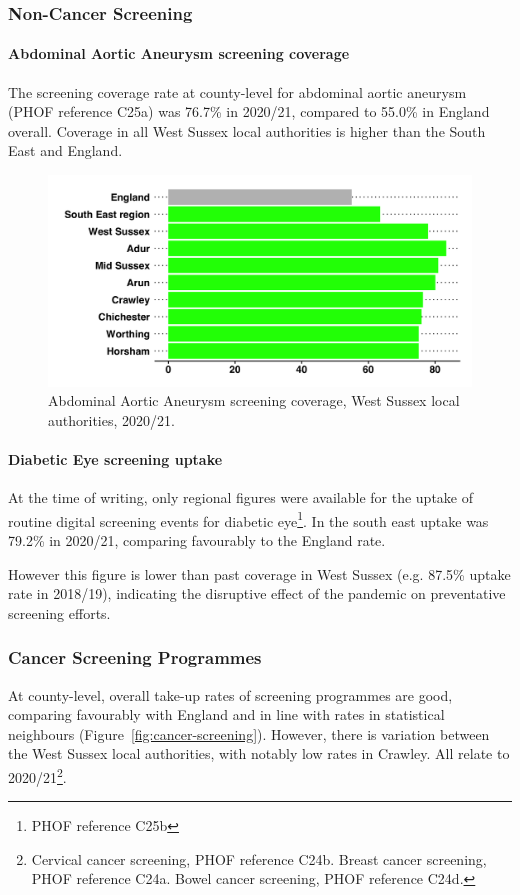 \subsubsection{Non-Cancer Screening}
\paragraph{Abdominal Aortic Aneurysm screening coverage} The screening coverage rate at county-level for abdominal aortic aneurysm (PHOF reference C25a) was 76.7\% in 2020/21, compared to 55.0\% in England overall. Coverage in all West Sussex local authorities is higher than the South East and England.
\begin{figure}[ht]
    \caption{Abdominal Aortic Aneurysm screening coverage, West Sussex local authorities, 2020/21.}
    \label{figure:aaa:screening}
    \centering
    \includegraphics[width=\linewidth]{images/aaa_rag_bar.png}
\end{figure}

\paragraph{Diabetic Eye screening uptake}At the time of writing, only regional figures were available for the uptake of routine digital screening events for diabetic eye\footnote{PHOF reference C25b}. In the south east uptake was 79.2\% in 2020/21, comparing favourably to the England rate.

However this figure is lower than past coverage in West Sussex (e.g. 87.5\% uptake rate in 2018/19), indicating the disruptive effect of the pandemic on preventative screening efforts.



\subsubsection{Cancer Screening Programmes}
At county-level, overall take-up rates of screening programmes are good, comparing favourably with England and in line with rates in statistical neighbours (Figure~\ref{fig:cancer-screening}). However, there is variation between the West Sussex local authorities, with notably low rates in Crawley. All relate to 2020/21\footnote{Cervical cancer screening, PHOF reference C24b. Breast cancer screening, PHOF reference C24a. Bowel cancer screening, PHOF reference C24d.}.

